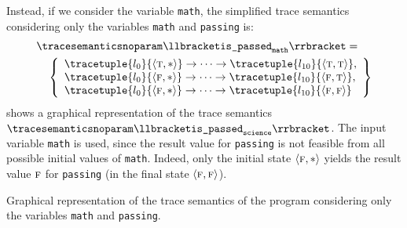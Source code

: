 \begin{example}
Instead, if we consider the variable \texttt{math}, the simplified trace semantics considering only the variables \texttt{math} and \texttt{passing} is:
\begin{align*}
  &{\tracesemanticsnoparam\semanticsof{\texttt{is\_passed}_\texttt{math}}
  =}\\
  &\quad\left\{
    \begin{array}{l}
    \tracetuple{\locinit}{\tuple\true\anyvalue}\tracearrow\tracetuple{\loc{10}}{\tuple\true\true}, \\
    \tracetuple{\locinit}{\tuple\false\anyvalue}\tracearrow\tracetuple{\loc{10}}{\tuple\false\true}, \\
    \tracetuple{\locinit}{\tuple\false\anyvalue}\tracearrow\tracetuple{\loc{10}}{\tuple\false\false}
  \end{array}
  \right\}
\end{align*}
 shows a graphical representation of the trace semantics $\tracesemanticsnoparam\semanticsof{\texttt{is\_passed}_\texttt{science}}$.
The input variable \texttt{math} is used, since the result value for \texttt{passing} is not feasible from all possible initial values of \texttt{math}.
Indeed, only the initial state $\langle \textsc{f}, {*} \rangle$ yields the result value $\textsc{f}$ for \texttt{passing} (in the final state $\langle \textsc{f}, \textsc{f} \rangle$).
\end{example}


\begin{marginfigure}[*-9]
\caption{Graphical representation of the trace semantics of the program  considering only the variables \texttt{math} and \texttt{passing}.}
\end{marginfigure}

